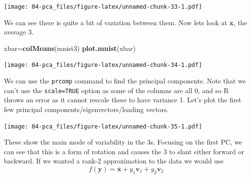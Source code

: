 \documentclass[]{book}
\newenvironment{Shaded}{\begin{snugshade}}{\end{snugshade}}
\newcommand{\CommentTok}[1]{\textcolor[rgb]{0.56,0.35,0.01}{\textit{#1}}}
\newcommand{\DataTypeTok}[1]{\textcolor[rgb]{0.13,0.29,0.53}{#1}}
\newcommand{\DecValTok}[1]{\textcolor[rgb]{0.00,0.00,0.81}{#1}}
\newcommand{\KeywordTok}[1]{\textcolor[rgb]{0.13,0.29,0.53}{\textbf{#1}}}
\newcommand{\NormalTok}[1]{#1}
\newcommand{\OperatorTok}[1]{\textcolor[rgb]{0.81,0.36,0.00}{\textbf{#1}}}
\newcommand{\StringTok}[1]{\textcolor[rgb]{0.31,0.60,0.02}{#1}}
\theoremstyle{definition}
\theoremstyle{definition}
\theoremstyle{definition}
\theoremstyle{remark}
\begin{document}
\begin{Shaded}
\end{Shaded}

\texttt{[image: 04-pca\_files/figure-latex/unnamed-chunk-33-1.pdf]}

We can see there is quite a bit of variation between them.
Now lets look at \(\bar{\mathbf x}\), the average 3.

\begin{Shaded}
\begin{Highlighting}[]
\NormalTok{xbar=}\KeywordTok{colMeans}\NormalTok{(mnist3)}
\KeywordTok{plot.mnist}\NormalTok{(xbar)}
\end{Highlighting}
\end{Shaded}

\texttt{[image: 04-pca\_files/figure-latex/unnamed-chunk-34-1.pdf]}

We can use the \texttt{prcomp} command to find the principal components. Note that we can't use the \texttt{scale=TRUE} option as some of the columns are all 0, and so R throws an error as it cannot rescale these to have variance 1. Let's plot the first few principal components/eigenvectors/loading vectors.

\begin{Shaded}
\end{Shaded}

\texttt{[image: 04-pca\_files/figure-latex/unnamed-chunk-35-1.pdf]}

These show the main mode of variability in the 3s. Focusing on the first PC, we can see that this is a form of rotation and causes the 3 to slant either forward or backward. If we wanted a rank-2 approximation to the data we would use
\[f(\mathbf y) = \bar{\mathbf x} + y_1 \mathbf v_1 + y_2 \mathbf v_2\]
\end{document}
